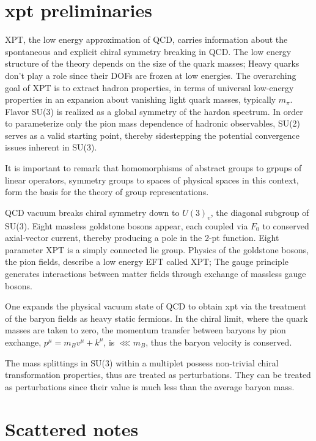 \documentclass[12pt,tightenlines, raggedbottom, prd, notitlepage]{revtex4-1}
\begin{document}
\section*{xpt preliminaries}

XPT, the low energy approximation of QCD, carries information about the spontaneous and explicit chiral symmetry breaking in QCD. The low energy structure
of the theory depends on the size of the quark masses; Heavy quarks don't play a role since their DOFs are frozen at low energies.  
The overarching goal of XPT is to extract hadron properties, in terms of universal low-energy properties in an expansion about vanishing light
quark masses, typically $m_\pi$. Flavor SU(3) is realized as a global symmetry of the hardon spectrum. In order to parameterize only the pion mass dependence of hadronic observables, SU(2) serves as a valid starting point,
thereby sidestepping the potential convergence issues inherent in SU(3). 

It is important to remark that homomorphisms of abstract groups to grpups of linear operators, symmetry groups to spaces of
physical spaces in this context, form the basis for the theory of group representations. 

QCD vacuum breaks chiral symmetry down to $U(3)_v$, the diagonal subgroup of SU(3). Eight massless goldstone bosons appear,
each coupled via $F_0$ to conserved axial-vector current, thereby producing a pole in the 2-pt function. Eight parameter XPT is a simply connected
lie group.  Physics of the goldstone bosons, the pion fields, describe a low energy EFT called XPT; 
The gauge principle generates interactions between matter fields through exchange of massless gauge bosons.   
  
One expands the physical vacuum state of QCD to obtain xpt via the treatment of the baryon fields as heavy static fermions.
In the chiral limit, where the quark masses are taken to zero, the momentum transfer between baryons by pion exchange, $p^\mu = m_Bv^\mu + k^\mu$,
is $\lll m_B$, thus the baryon velocity is conserved.

The mass splittings in SU(3) within a multiplet possess non-trivial chiral transformation properties, thus are treated as perturbations.
They can be treated as perturbations since their value is much less than the average baryon mass.

\section*{Scattered notes}
\end{document}
